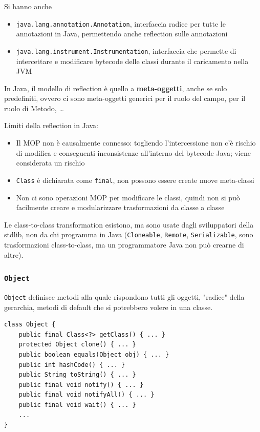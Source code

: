 Si hanno anche
\begin{itemize}
	\item \texttt{java.lang.annotation.Annotation}, interfaccia radice per tutte le annotazioni in Java, permettendo anche reflection sulle annotazioni

	\item \texttt{java.lang.instrument.Instrumentation}, interfaccia che permette di intercettare e modificare bytecode delle classi durante il caricamento nella JVM
\end{itemize}

In Java, il modello di reflection è quello a \textbf{meta-oggetti}, anche se solo predefiniti, ovvero ci sono meta-oggetti generici per il ruolo del campo, per il ruolo di Metodo, \dots

Limiti della reflection in Java:
\begin{itemize}
	\item Il MOP non è causalmente connesso: togliendo l'intercessione non c'è rischio di modifica e conseguenti inconsistenze all'interno del bytecode Java; viene considerata un rischio

	\item \texttt{Class} è dichiarata come \texttt{final}, non possono essere create nuove meta-classi

	\item Non ci sono operazioni MOP per modificare le classi, quindi non si può facilmente creare e modularizzare trasformazioni da classe a classe
\end{itemize}

Le class-to-class transformation esistono, ma sono usate dagli sviluppatori della stdlib, non da chi programma in Java (\texttt{Cloneable}, \texttt{Remote}, \texttt{Serializable}, sono trasformazioni class-to-class, ma un programmatore Java non può crearne di altre).

\subsubsection{\texttt{Object}}

\texttt{Object} definisce metodi alla quale rispondono tutti gli oggetti, "radice" della gerarchia, metodi di default che si potrebbero volere in una classe.
\begin{verbatim}
class Object {
    public final Class<?> getClass() { ... }
    protected Object clone() { ... }
    public boolean equals(Object obj) { ... }
    public int hashCode() { ... }
    public String toString() { ... }
    public final void notify() { ... }
    public final void notifyAll() { ... }
    public final void wait() { ... }
    ...
}
\end{verbatim}

